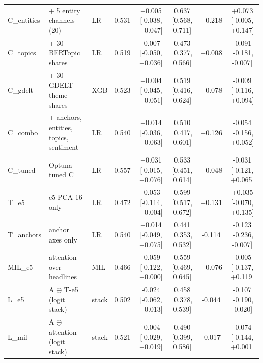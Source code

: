 \begin{tabular}{@{}l l l c c c c c@{}}
C\_entities & + 5 entity channels (20) & LR & 0.531 & +0.005 {\scriptsize[-0.038, +0.047]} & 0.637 {\scriptsize[0.568, 0.711]} & +0.218 & +0.073 {\scriptsize[-0.005, +0.147]} \\
C\_topics & + 30 BERTopic shares & LR & 0.519 & -0.007 {\scriptsize[-0.050, +0.036]} & 0.473 {\scriptsize[0.377, 0.566]} & +0.008 & -0.091 {\scriptsize[-0.181, -0.007]} \\
C\_gdelt & + 30 GDELT theme shares & XGB & 0.523 & +0.004 {\scriptsize[-0.045, +0.051]} & 0.519 {\scriptsize[0.416, 0.624]} & +0.078 & -0.009 {\scriptsize[-0.116, +0.094]} \\
C\_combo & + anchors, entities, topics, sentiment & LR & 0.540 & +0.014 {\scriptsize[-0.036, +0.063]} & 0.510 {\scriptsize[0.417, 0.601]} & +0.126 & -0.054 {\scriptsize[-0.156, +0.052]} \\
\midrule
C\_tuned & Optuna-tuned C & LR & 0.557 & +0.031 {\scriptsize[-0.015, +0.076]} & 0.533 {\scriptsize[0.451, 0.614]} & +0.048 & -0.031 {\scriptsize[-0.121, +0.065]} \\
\midrule
T\_e5 & e5 PCA-16 only & LR & 0.472 & -0.053 {\scriptsize[-0.114, +0.004]} & 0.599 {\scriptsize[0.517, 0.672]} & +0.131 & +0.035 {\scriptsize[-0.070, +0.135]} \\
T\_anchors & anchor axes only & LR & 0.540 & +0.014 {\scriptsize[-0.049, +0.075]} & 0.441 {\scriptsize[0.353, 0.532]} & -0.114 & -0.123 {\scriptsize[-0.236, -0.007]} \\
MIL\_e5 & attention over headlines & MIL & 0.466 & -0.059 {\scriptsize[-0.122, +0.000]} & 0.559 {\scriptsize[0.469, 0.645]} & +0.076 & -0.005 {\scriptsize[-0.137, +0.119]} \\
\midrule
L\_e5 & A $\oplus$ T-e5 (logit stack) & stack & 0.502 & -0.024 {\scriptsize[-0.062, +0.013]} & 0.458 {\scriptsize[0.378, 0.539]} & -0.044 & -0.107 {\scriptsize[-0.190, -0.020]} \\
L\_mil & A $\oplus$ attention (logit stack) & stack & 0.521 & -0.004 {\scriptsize[-0.029, +0.019]} & 0.490 {\scriptsize[0.399, 0.586]} & -0.017 & -0.074 {\scriptsize[-0.144, +0.001]} \\
\bottomrule
\end{tabular}

